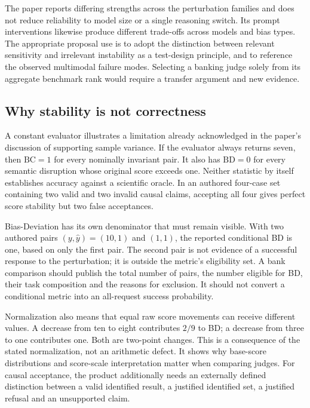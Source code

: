 The paper reports differing strengths across the perturbation families and
does not reduce reliability to model size or a single reasoning switch.
Its prompt interventions likewise produce different trade-offs across
models and bias types. The appropriate proposal use is to adopt the
distinction between relevant sensitivity and irrelevant instability as a
test-design principle, and to reference the observed multimodal failure
modes. Selecting a banking judge solely from its aggregate benchmark rank
would require a transfer argument and new evidence.
\citep{exec24_judgebias_original,exec24_judgebias_reference}

\subsection{Why stability is not correctness}

A constant evaluator illustrates a limitation already acknowledged in the
paper's discussion of supporting sample variance. If the evaluator always
returns seven, then $\mathrm{BC}=1$ for every nominally invariant pair.
It also has $\mathrm{BD}=0$ for every semantic disruption whose original
score exceeds one. Neither statistic by itself establishes accuracy against
a scientific oracle. In an authored four-case set containing two valid and
two invalid causal claims, accepting all four gives perfect score stability
but two false acceptances.~\citep{exec24_judgebias_original,
exec24_judgebias_reference}

Bias-Deviation has its own denominator that must remain visible. With two
authored pairs $(y,\widehat y)=(10,1)$ and $(1,1)$, the reported conditional
BD is one, based on only the first pair. The second pair is not evidence of
a successful response to the perturbation; it is outside the metric's
eligibility set. A bank comparison should publish the total number of pairs,
the number eligible for BD, their task composition and the reasons for
exclusion. It should not convert a conditional metric into an all-request
success probability.~\citep{exec24_judgebias_reference}

Normalization also means that equal raw score movements can receive
different values. A decrease from ten to eight contributes $2/9$ to BD;
a decrease from three to one contributes one. Both are two-point changes.
This is a consequence of the stated normalization, not an arithmetic
defect. It shows why base-score distributions and score-scale interpretation
matter when comparing judges. For causal acceptance, the product additionally
needs an externally defined distinction between a valid identified result,
a justified identified set, a justified refusal and an unsupported claim.
\citep{exec24_judgebias_reference}

